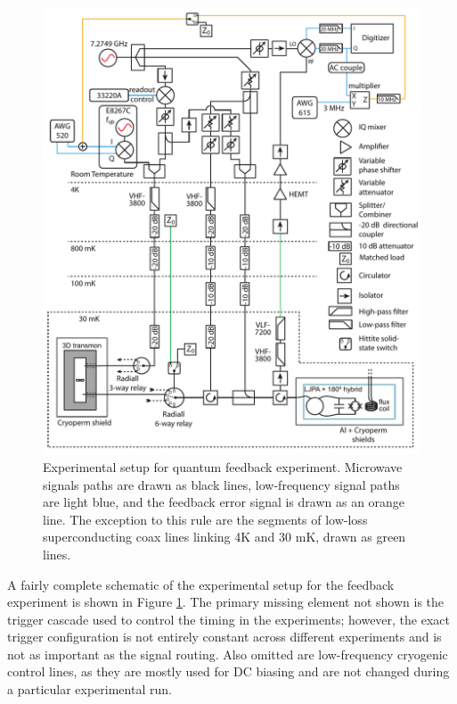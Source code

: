 \begin{figure}
\begin{center}
	\includegraphics[width = 6in]{qfb_exp_chapter/full_schematic}
\end{center}
\caption[Experimental setup for quantum feedback]{Experimental setup for quantum feedback experiment.  Microwave signals paths are drawn as black lines, low-frequency signal paths are light blue, and the feedback error signal is drawn as an orange line.  The exception to this rule are the segments of low-loss superconducting coax lines linking 4K and 30 mK, drawn as green lines.}
\label{fig:full_schem}
\end{figure}

A fairly complete schematic of the experimental setup for the feedback experiment is shown in Figure \ref{fig:full_schem}.  The primary missing element not shown is the trigger cascade used to control the timing in the experiments; however, the exact trigger configuration is not entirely constant across different experiments and is not as important as the signal routing.  Also omitted are low-frequency cryogenic control lines, as they are mostly used for DC biasing and are not changed during a particular experimental run.

